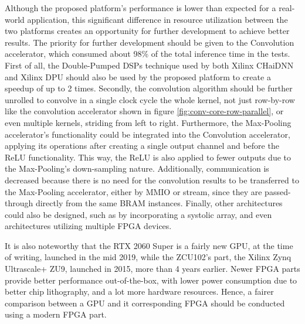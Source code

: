 Although the proposed platform's performance is lower than expected for a real-world application, this significant difference in resource utilization between the two platforms creates an opportunity for further development to achieve better results. The priority for further development should be given to the Convolution accelerator, which consumed about 98\% of the total inference time in the tests. First of all, the Double-Pumped DSPs technique used by both Xilinx CHaiDNN and Xilinx DPU should also be used by the proposed platform to create a speedup of up to 2 times. Secondly, the convolution algorithm should be further unrolled to convolve in a single clock cycle the whole kernel, not just row-by-row like the convolution accelerator shown in figure \ref{fig:conv-core-row-parallel}, or even multiple kernels, striding from left to right. Furthermore, the Max-Pooling accelerator's functionality could be integrated into the Convolution accelerator, applying its operations after creating a single output channel and before the ReLU functionality. This way, the ReLU is also applied to fewer outputs due to the Max-Pooling's down-sampling nature. Additionally, communication is decreased because there is no need for the convolution results to be transferred to the Max-Pooling accelerator, either by MMIO or stream, since they are passed-through directly from the same BRAM instances. Finally, other architectures could also be designed, such as by incorporating a systolic array, and even architectures utilizing multiple FPGA devices.

It is also noteworthy that the RTX 2060 Super is a fairly new GPU, at the time of writing, launched in the mid 2019, while the ZCU102's part, the Xilinx Zynq Ultrascale+ ZU9, launched in 2015, more than 4 years earlier. Newer FPGA parts provide better performance out-of-the-box, with lower power consumption due to better chip lithography, and a lot more hardware resources. Hence, a fairer comparison between a GPU and it corresponding FPGA should be conducted using a modern FPGA part.
